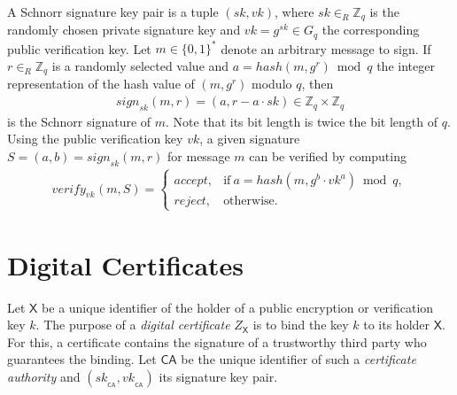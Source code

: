 \documentclass[bibtotoc,halfparskip,oneside]{scrreprt}
\newcommand{\sk}[1]{\mathit{sk}_{#1}\xspace}
\newcommand{\vk}[1]{\mathit{vk}_{#1}\xspace}
\newcommand{\SK}[1]{\sk{_#1}\xspace}
\newcommand{\VK}[1]{\vk{_#1}\xspace}
\newcommand{\CA}{\ensuremath{\mathsf{CA}}\xspace}
\begin{document}
A Schnorr signature key pair is a tuple $(sk,vk)$, where $sk\in_R\mathbb{Z}_q$ is the randomly chosen private signature key and $vk=g^{sk}\in G_q$ the corresponding public verification key. Let $m\in\{0,1\}^*$ denote an arbitrary message to sign. If $r\in_R\mathbb{Z}_q$ is a randomly selected value and $a=\mathit{hash}(m,g^r) \bmod q$ the integer representation of the hash value of $(m,g^r)$ modulo $q$, then
\begin{align}
	\mathit{sign}_{sk}(m,r)=(a,r-a\cdot sk)\in \mathbb{Z}_q\times \mathbb{Z}_q
\end{align}
is the Schnorr signature of $m$. Note that its bit length is twice the bit length of $q$. Using the public verification key $vk$, a given signature $S=(a,b)=\mathit{sign}_{sk}(m,r)$ for message $m$ can be verified by computing
\begin{align}
	\mathit{verify}_{\vk{}}(m,S)=\begin{cases}
	\mathit{accept}, & \text{if}~ a = \mathit{hash}(m,g^b\cdot vk^a) \bmod q,\\
	\mathit{reject}, & \text{otherwise}.
	\end{cases}
\end{align}

\section{Digital Certificates} 

Let $\mathsf{X}$ be a unique identifier of the holder of a public encryption or verification key $k$. The purpose of a \emph{digital certificate} $Z_{\mathsf{X}}$ is to bind the key $k$ to its holder $\mathsf{X}$. For this, a certificate contains the signature of a trustworthy third party who guarantees the binding. Let $\CA$ be the unique identifier of such a \emph{certificate authority} and $(\SK{\CA},\VK{\CA})$ its signature key pair.
\end{document}
